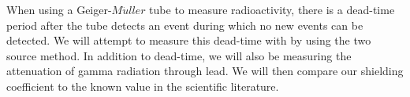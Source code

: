 \par When using a Geiger-$M\ddot{u}ller$ tube to measure radioactivity, there is a dead-time period after the tube detects an event during which no new events can be detected. We will attempt to measure this dead-time with by using the two source method. In addition to dead-time, we will also be measuring the attenuation of gamma radiation through lead. We will then compare our shielding coefficient to the known value in the scientific literature.